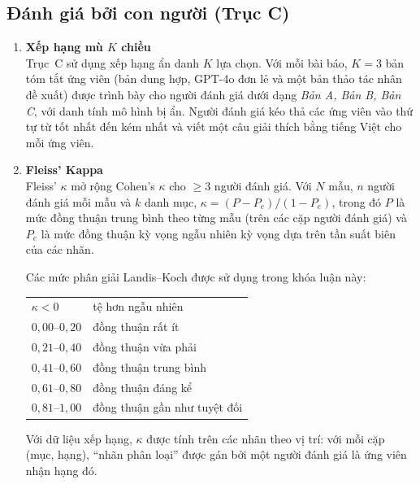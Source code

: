 \subsection{Đánh giá bởi con người (Trục C)}

\begin{enumerate}[label=(\alph*), leftmargin=*]

    \item \textbf{Xếp hạng mù $K$ chiều} \\
    Trục~C sử dụng xếp hạng ẩn danh $K$ lựa chọn. Với mỗi bài báo, $K = 3$ bản tóm tắt ứng viên (bản dung hợp, GPT-4o đơn lẻ và một bản thảo tác nhân đề xuất) được trình bày cho người đánh giá dưới dạng \textit{Bản A, Bản B, Bản C}, với danh tính mô hình bị ẩn. Người đánh giá kéo thả các ứng viên vào thứ tự từ tốt nhất đến kém nhất và viết một câu giải thích bằng tiếng Việt cho mỗi ứng viên.

    \item \textbf{Fleiss' Kappa} \\
    Fleiss' $\kappa$ \cite{Landis1977} mở rộng Cohen's $\kappa$ cho $\geq 3$ người đánh giá. Với $N$ mẫu, $n$ người đánh giá mỗi mẫu và $k$ danh mục, $\kappa = (P - P_e) / (1 - P_e)$, trong đó $P$ là mức đồng thuận trung bình theo từng mẫu (trên các cặp người đánh giá) và $P_e$ là mức đồng thuận kỳ vọng ngẫu nhiên kỳ vọng dựa trên tần suất biên của các nhãn.

    Các mức phân giải Landis--Koch được sử dụng trong khóa luận này:

    \begin{center}
    \begin{tabular}{ll}
    $\kappa < 0$       & tệ hơn ngẫu nhiên \\
    $0{,}00$--$0{,}20$ & đồng thuận rất ít \\
    $0{,}21$--$0{,}40$ & đồng thuận vừa phải \\
    $0{,}41$--$0{,}60$ & đồng thuận trung bình \\
    $0{,}61$--$0{,}80$ & đồng thuận đáng kể \\
    $0{,}81$--$1{,}00$ & đồng thuận gần như tuyệt đối \\
    \end{tabular}
    \end{center}

    Với dữ liệu xếp hạng, $\kappa$ được tính trên các nhãn theo vị trí: với mỗi cặp (mục, hạng), ``nhãn phân loại'' được gán bởi một người đánh giá là ứng viên nhận hạng đó.

\end{enumerate}

